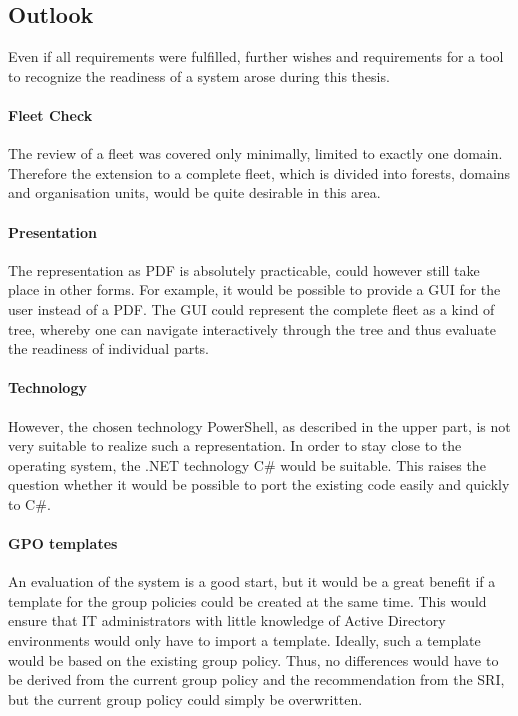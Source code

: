 \clearpage

\subsection{Outlook}
Even if all requirements were fulfilled, further wishes and requirements for a tool to recognize the readiness of a system arose during this thesis. 

\paragraph{Fleet Check}
The review of a fleet was covered only minimally, limited to exactly one domain. Therefore the extension to a complete fleet, which is divided into forests, domains and organisation units, would be quite desirable in this area. 

\paragraph{Presentation}
The representation as PDF is absolutely practicable, could however still take place in other forms. For example, it would be possible to provide a GUI for the user instead of a PDF. The GUI could represent the complete fleet as a kind of tree, whereby one can navigate interactively through the tree and thus evaluate the readiness of individual parts. 

\paragraph{Technology}
However, the chosen technology PowerShell, as described in the upper part, is not very suitable to realize such a representation. In order to stay close to the operating system, the .NET technology C\# would be suitable. This raises the question whether it would be possible to port the existing code easily and quickly to C\#. 

\paragraph{GPO templates}
An evaluation of the system is a good start, but it would be a great benefit if a template for the group policies could be created at the same time. This would ensure that IT administrators with little knowledge of Active Directory environments would only have to import a template. Ideally, such a template would be based on the existing group policy. Thus, no differences would have to be derived from the current group policy and the recommendation from the SRI, but the current group policy could simply be overwritten.


